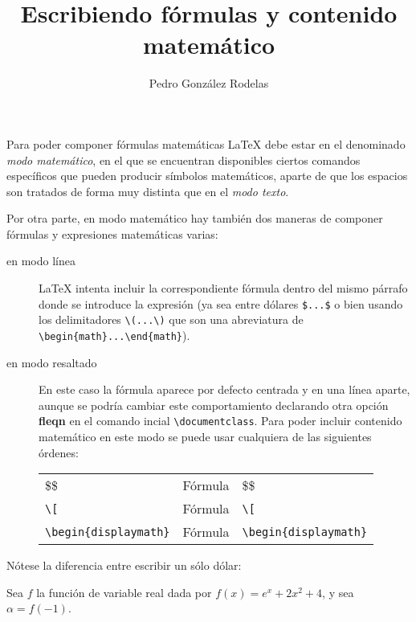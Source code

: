 \documentclass[11pt]{article}
\title{Escribiendo fórmulas y contenido matemático}
\author{Pedro González Rodelas}
\begin{document}
	
\maketitle


Para poder componer fórmulas matemáticas {\LaTeX} debe estar en el denominado \emph{modo matemático}, en el que se encuentran disponibles ciertos comandos específicos que pueden producir símbolos matemáticos, aparte de que los espacios son tratados de forma muy distinta que en el \emph{modo texto}.

Por otra parte, en modo matemático hay también dos maneras de componer fórmulas y expresiones matemáticas varias:

\begin{description}
\item[en modo línea] {\LaTeX} intenta incluir la correspondiente fórmula dentro del mismo párrafo donde se introduce la expresión (ya sea entre dólares \verb+$...$+ o bien usando los delimitadores \verb+\(...\)+ que son una abreviatura de \verb+ \begin{math}...\end{math}+).
\item[en modo resaltado] En este caso la fórmula aparece por defecto centrada y en una línea aparte, aunque se podría cambiar este comportamiento declarando otra opción {\bf fleqn} en el comando incial \verb|\documentclass|. Para poder incluir contenido matemático en este modo se puede usar cualquiera de las siguientes órdenes:


\begin{tabular}{lll}
\$\$                              & Fórmula    &    \$\$    \\
\verb|\[|                         & Fórmula    &  \verb+\[+ \\
\verb+\begin{displaymath}+        & Fórmula    & \verb+\begin{displaymath}+
\end{tabular}
   
\end{description}



Nótese la diferencia entre escribir un sólo dólar:


\begin{Example}[gobble=0]
Sea $f$ la funci\'on de variable real  dada por 
$f(x)=e^x+2x^2+4$, y sea $\alpha = f(-1)$.
\end{Example}
\end{document}
